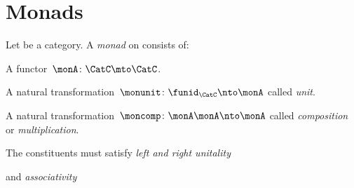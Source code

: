 

\section{Monads}
\label{sec:monads}

\begin{ctdefinition}[Monad]
  \label{def:monad}
  Let \CatC be a category. A \emph{monad} on \CatC consists of:
  \begin{compactenum}
    \item A functor~$ \monA \colon \CatC \mto \CatC$.
    \item A natural transformation~$\monunit \colon \funid_\CatC \nto \monA$ called \emph{unit}.
    \item A natural transformation~$\moncomp \colon \monA \monA \nto \monA$ called \emph{composition} or \emph{multiplication}.
  \end{compactenum}
  The constituents must satisfy \emph{left and right unitality}
  \begin{center}
  \end{center}
  and \emph{associativity}
  \begin{center}
  \end{center}
\end{ctdefinition}
